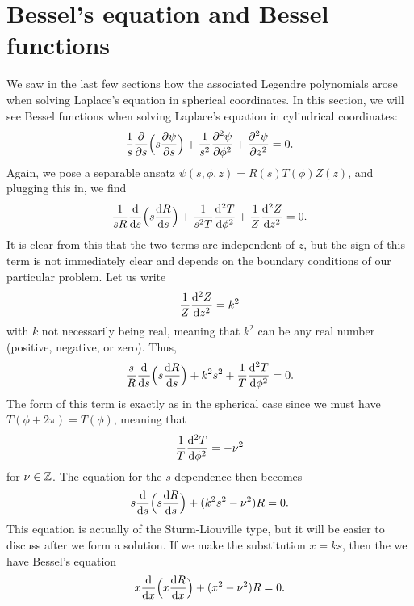 \chapter{Bessel's equation and Bessel functions}


We saw in the last few sections how the associated Legendre polynomials arose when solving Laplace's equation in spherical coordinates.
In this section, we will see Bessel functions when solving Laplace's equation in cylindrical coordinates:
\begin{eqnarray}
    \frac{1}{s} \pdv{s} \Big( s \pdv{\psi}{s} \Big) + \frac{1}{s^2} \pdv[2]{\psi}{\phi} + \pdv[2]{\psi}{z} = 0
.\end{eqnarray}
Again, we pose a separable ansatz $\psi(s,\phi,z) = R(s)T(\phi)Z(z)$, and plugging this in, we find
\begin{eqnarray}
    \frac{1}{s R} \dv{s} \Big( s \dv{R}{s} \Big) + \frac{1}{s^2 T} \dv[2]{T}{\phi} + \frac{1}{Z}\dv[2]{Z}{z} = 0
.\end{eqnarray}
It is clear from this that the two terms are independent of $z$, but the sign of this term is not immediately clear and depends on the boundary conditions of our particular problem.
Let us write 
\begin{eqnarray}
    \frac{1}{Z} \dv[2]{Z}{z} = k^2
\end{eqnarray}
with $k$ not necessarily being real, meaning that $k^2$ can be any real number (positive, negative, or zero).
Thus,
\begin{align}
    \frac{s}{R} \dv{s} \Big( s \dv{R}{s} \Big) + k^2 s^2 + \frac{1}{T} \dv[2]{T}{\phi} = 0
.\end{align}
The form of this term is exactly as in the spherical case since we must have $T(\phi + 2\pi) = T(\phi)$, meaning that
\begin{eqnarray}
    \frac{1}{T} \dv[2]{T}{\phi} = -\nu^2
\end{eqnarray}
for $\nu \in \mathbb{Z}$.
The equation for the $s$-dependence then becomes
\begin{eqnarray}
    s \dv{s} \Big( s \dv{R}{s} \Big) + (k^2 s^2 - \nu^2) R = 0
.\end{eqnarray}
This equation is actually of the Sturm-Liouville type, but it will be easier to discuss after we form a solution.
If we make the substitution $x = ks$, then the we have Bessel's equation
\begin{eqnarray}
    x \dv{x}\Big( x \dv{R}{x} \Big) + (x^2 - \nu^2)R = 0
.\end{eqnarray}


